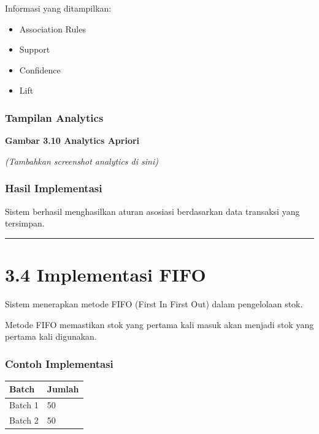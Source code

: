 Informasi yang ditampilkan:

\begin{itemize}
\tightlist
\item
  Association Rules
\item
  Support
\item
  Confidence
\item
  Lift
\end{itemize}

\subsubsection{Tampilan Analytics}\label{tampilan-analytics}

\textbf{Gambar 3.10 Analytics Apriori}

\emph{(Tambahkan screenshot analytics di sini)}

\subsubsection{Hasil Implementasi}\label{hasil-implementasi-7}

Sistem berhasil menghasilkan aturan asosiasi berdasarkan data transaksi yang tersimpan.

\begin{center}\rule{0.5\linewidth}{0.5pt}\end{center}

\section{3.4 Implementasi FIFO}\label{implementasi-fifo}

Sistem menerapkan metode FIFO (First In First Out) dalam pengelolaan stok.

Metode FIFO memastikan stok yang pertama kali masuk akan menjadi stok yang pertama kali digunakan.

\subsubsection{Contoh Implementasi}\label{contoh-implementasi}

{\def\LTcaptype{none} %
\begin{longtable}[]{@{}ll@{}}
\toprule\noalign{}
Batch & Jumlah \\
\midrule\noalign{}
\endhead
\bottomrule\noalign{}
\endlastfoot
Batch 1 & 50 \\
Batch 2 & 50 \\
\end{longtable}
}

